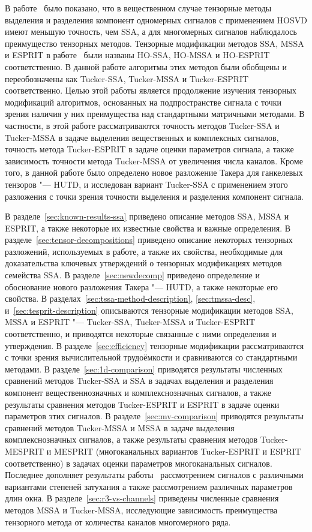\documentclass[specialist,
  substylefile = spbu.rtx,
subf,href,colorlinks=true, 12pt]{disser}
\theoremstyle{plain}
\theoremstyle{definition}
\theoremstyle{remark}
\def\newdecomp/{HUTD}
\def\tssa/{Tucker-SSA}
\def\tmssa/{Tucker-MSSA}
\def\tesprit/{Tucker-ESPRIT}
\def\tmesprit/{Tucker-MESPRIT}
\begin{document}
В работе~\cite{Thesis2024} было показано, что в
вещественном случае тензорные методы выделения
и разделения компонент одномерных сигналов с применением HOSVD имеют
меньшую точность, чем SSA, а для многомерных сигналов наблюдалось
преимущество тензорных методов. Тензорные модификации методов SSA,
MSSA и ESPRIT в работе~\cite{Thesis2024} были названы HO-SSA, HO-MSSA
и HO-ESPRIT
соответственно. В данной работе алгоритмы этих методов были обобщены
и переобозначены как \tssa/, \tmssa/ и \tesprit/ соответственно.
Целью этой работы является продолжение изучения тензорных модификаций
алгоритмов, основанных на подпространстве сигнала с точки зрения наличия
у них преимущества над стандартными матричными методами.
В частности, в этой работе рассматриваются точность методов \tssa/ и \tmssa/ в
задаче выделения вещественных и комплексных сигналов, точность метода
\tesprit/ в задаче оценки параметров сигнала, а также зависимость точности
метода \tmssa/ от увеличения числа каналов.
Кроме того, в данной работе было определено новое разложение Такера
для ганкелевых тензоров "--- \newdecomp/, и исследован вариант \tssa/
с применением этого разложения с точки зрения точности выделения и
разделения компонент сигнала.

В разделе~\ref{sec:known-results-ssa} приведено описание методов
SSA, MSSA и ESPRIT, а также некоторые их известные свойства и важные
определения.
В разделе~\ref{sec:tensor-decompositions} приведено описание
некоторых тензорных разложений, используемых в работе,
а также их свойства, необходимые для доказательства ключевых утверждений о
тензорных модификациях методов семейства SSA.
В разделе~\ref{sec:newdecomp} приведено определение и обоснование
нового разложения Такера "--- \newdecomp/, а также некоторые его свойства.
В разделах~\ref{sec:tssa-method-description}, \ref{sec:tmssa-desc},
и~\ref{sec:tesprit-description} описываются тензорные модификации
методов SSA, MSSA и ESPRIT "--- \tssa/, \tmssa/ и \tesprit/
соответственно, и приводятся некоторые связанные с ними определения и
утверждения.
В разделе~\ref{sec:efficiency} тензорные модификации рассматриваются
с точки зрения вычислительной трудоёмкости и сравниваются со
стандартными методами.
В разделе~\ref{sec:1d-comparison} приводятся результаты численных
сравнений методов \tssa/ и SSA в задачах выделения и
разделения компонент вещественнозначных и комплекснозначных сигналов,
а также результаты сравнения методов \tesprit/ и ESPRIT в задаче
оценки параметров этих сигналов.
В разделе~\ref{sec:mv-comparison} приводятся результаты сравнений
методов \tmssa/ и MSSA в задаче выделения комплекснозначных сигналов,
а также результаты сравнения методов \tmesprit/ и MESPRIT
(многоканальных вариантов \tesprit/ и ESPRIT соответственно) в
задачах оценки параметров многоканальных сигналов.
Последнее дополняет результаты работы~\cite{hosvd-hooi-separation}
рассмотрением сигналов с различными вариантами степеней затухания
а также рассмотрением различных параметров длин окна.
В разделе~\ref{sec:r3-vs-channels} приведены численные сравнения
методов MSSA и \tmssa/, исследующие зависимость преимущества тензорного
метода от количества каналов многомерного ряда.
\end{document}
